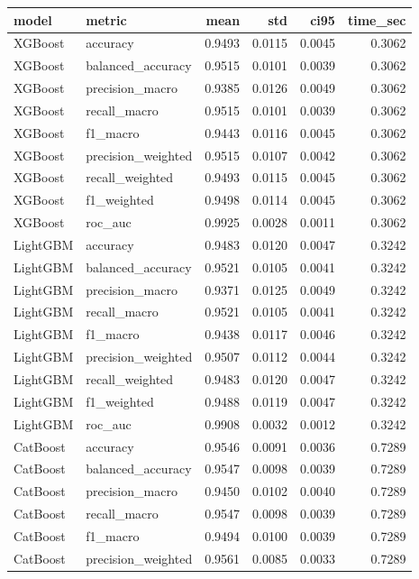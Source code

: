 \begin{tabular}{llrrrr}
\toprule
model & metric & mean & std & ci95 & time_sec \\
\midrule
XGBoost & accuracy & 0.9493 & 0.0115 & 0.0045 & 0.3062 \\
XGBoost & balanced_accuracy & 0.9515 & 0.0101 & 0.0039 & 0.3062 \\
XGBoost & precision_macro & 0.9385 & 0.0126 & 0.0049 & 0.3062 \\
XGBoost & recall_macro & 0.9515 & 0.0101 & 0.0039 & 0.3062 \\
XGBoost & f1_macro & 0.9443 & 0.0116 & 0.0045 & 0.3062 \\
XGBoost & precision_weighted & 0.9515 & 0.0107 & 0.0042 & 0.3062 \\
XGBoost & recall_weighted & 0.9493 & 0.0115 & 0.0045 & 0.3062 \\
XGBoost & f1_weighted & 0.9498 & 0.0114 & 0.0045 & 0.3062 \\
XGBoost & roc_auc & 0.9925 & 0.0028 & 0.0011 & 0.3062 \\
LightGBM & accuracy & 0.9483 & 0.0120 & 0.0047 & 0.3242 \\
LightGBM & balanced_accuracy & 0.9521 & 0.0105 & 0.0041 & 0.3242 \\
LightGBM & precision_macro & 0.9371 & 0.0125 & 0.0049 & 0.3242 \\
LightGBM & recall_macro & 0.9521 & 0.0105 & 0.0041 & 0.3242 \\
LightGBM & f1_macro & 0.9438 & 0.0117 & 0.0046 & 0.3242 \\
LightGBM & precision_weighted & 0.9507 & 0.0112 & 0.0044 & 0.3242 \\
LightGBM & recall_weighted & 0.9483 & 0.0120 & 0.0047 & 0.3242 \\
LightGBM & f1_weighted & 0.9488 & 0.0119 & 0.0047 & 0.3242 \\
LightGBM & roc_auc & 0.9908 & 0.0032 & 0.0012 & 0.3242 \\
CatBoost & accuracy & 0.9546 & 0.0091 & 0.0036 & 0.7289 \\
CatBoost & balanced_accuracy & 0.9547 & 0.0098 & 0.0039 & 0.7289 \\
CatBoost & precision_macro & 0.9450 & 0.0102 & 0.0040 & 0.7289 \\
CatBoost & recall_macro & 0.9547 & 0.0098 & 0.0039 & 0.7289 \\
CatBoost & f1_macro & 0.9494 & 0.0100 & 0.0039 & 0.7289 \\
CatBoost & precision_weighted & 0.9561 & 0.0085 & 0.0033 & 0.7289 \\

\end{tabular}
